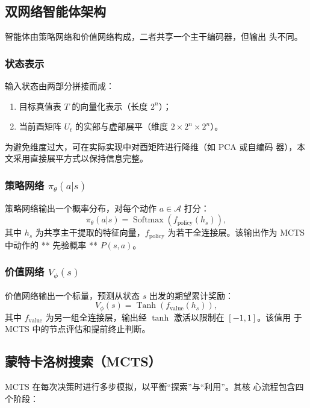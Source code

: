 \documentclass[11pt,letterpaper]{ctexart}
\begin{document}
\subsection{双网络智能体架构}

智能体由策略网络和价值网络构成，二者共享一个主干编码器，但输出
头不同。

\subsubsection{状态表示}

输入状态由两部分拼接而成：

\begin{enumerate}
  \item 目标真值表 $T$ 的向量化表示（长度 $2^n$）；

  \item 当前酉矩阵 $U_t$ 的实部与虚部展平（维度 $2 \times 2^n \times 2^n$）。
\end{enumerate}

为避免维度过大，可在实际实现中对酉矩阵进行降维（如 PCA 或自编码
器），本文采用直接展平方式以保持信息完整。

\subsubsection{策略网络 $\pi_\theta(a|s)$}

策略网络输出一个概率分布，对每个动作 $a \in \mathcal{A}$ 打分：
\[
  \pi_\theta(a|s)=\operatorname{Softmax}(f_{\mathrm{policy}}(h_s)),
\]
其中 $h_s$ 为共享主干提取的特征向量，$f_{\mathrm{policy}}$ 为若干全连接层。该输出作为
MCTS 中动作的 ** 先验概率 ** $P(s,a)$。

\subsubsection{价值网络 $V_\phi(s)$}

价值网络输出一个标量，预测从状态 $s$ 出发的期望累计奖励：
\[
  V_\phi(s)=\operatorname{Tanh}(f_{\mathrm{value}}(h_s)),
\]
其中 $f_{\mathrm{value}}$ 为另一组全连接层，输出经 $\tanh$ 激活以限制在 $[-1,1]$。该值用
于 MCTS 中的节点评估和提前终止判断。

\newpage

\subsection{蒙特卡洛树搜索（MCTS）}

MCTS 在每次决策时进行多步模拟，以平衡“探索”与“利用”。其核
心流程包含四个阶段：
\end{document}
